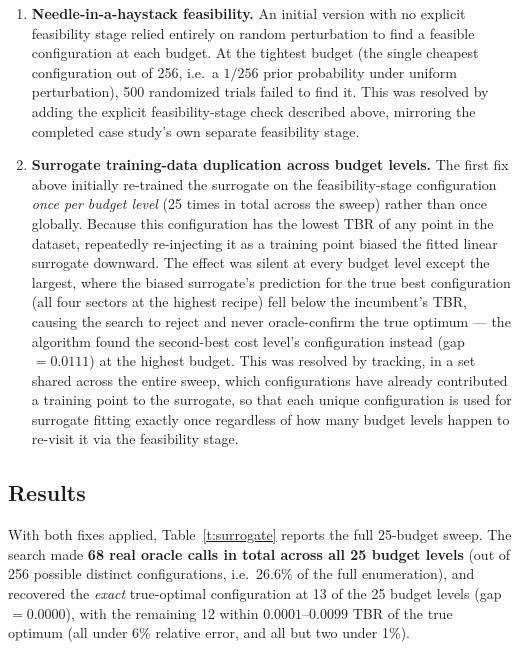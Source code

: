 \documentclass[11pt]{article}
\begin{document}
\begin{enumerate}
\item \textbf{Needle-in-a-haystack feasibility.} An initial version with
no explicit feasibility stage relied entirely on random perturbation to
find a feasible configuration at each budget. At the tightest budget
(the single cheapest configuration out of 256, i.e.\ a $1/256$ prior
probability under uniform perturbation), 500 randomized trials failed to
find it. This was resolved by adding the explicit feasibility-stage check
described above, mirroring the completed case study's own separate
feasibility stage.
\item \textbf{Surrogate training-data duplication across budget levels.}
The first fix above initially re-trained the surrogate on the
feasibility-stage configuration \emph{once per budget level} (25 times in
total across the sweep) rather than once globally. Because this
configuration has the lowest TBR of any point in the dataset, repeatedly
re-injecting it as a training point biased the fitted linear surrogate
downward. The effect was silent at every budget level except the largest,
where the biased surrogate's prediction for the true best configuration
(all four sectors at the highest recipe) fell below the incumbent's TBR,
causing the search to reject and never oracle-confirm the true optimum ---
the algorithm found the second-best cost level's configuration instead
(gap $=0.0111$) at the highest budget. This was resolved by tracking, in a
set shared across the entire sweep, which configurations have already
contributed a training point to the surrogate, so that each unique
configuration is used for surrogate fitting exactly once regardless of how
many budget levels happen to re-visit it via the feasibility stage.
\end{enumerate}

\subsection{Results}

With both fixes applied, Table~\ref{t:surrogate} reports the full
25-budget sweep. The search made \textbf{68 real oracle calls in total
across all 25 budget levels} (out of 256 possible distinct
configurations, i.e.\ 26.6\% of the full enumeration), and recovered the
\emph{exact} true-optimal configuration at 13 of the 25 budget levels
(gap $=0.0000$), with the remaining 12 within $0.0001$--$0.0099$ TBR of the
true optimum (all under 6\% relative error, and all but two under 1\%).
\end{document}
